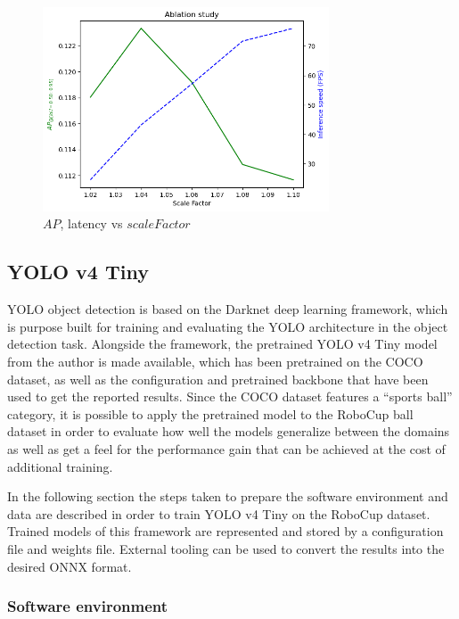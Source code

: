 \documentclass[a4paper,twoside,12pt]{report}
\begin{document}
\begin{figure}[h!]
\begin{center}
\includegraphics[width=8.5cm]{images/vj_ablation.png}
\caption{$AP$, latency vs $scaleFactor$}
\label{fig:vjspeeds}
\end{center}
\end{figure}

\subsection{YOLO v4 Tiny}

YOLO object detection is based on the Darknet deep learning framework, which is purpose built for training and evaluating the YOLO architecture in the object detection task. Alongside the framework, the pretrained YOLO v4 Tiny \citep{yolov4tiny} model from the author is made available, which has been pretrained on the COCO dataset, as well as the configuration and pretrained backbone that have been used to get the reported results. Since the COCO dataset features a ``sports ball'' category, it is possible to apply the pretrained model to the RoboCup ball dataset in order to evaluate how well the models generalize between the domains as well as get a feel for the performance gain that can be achieved at the cost of additional training.

In the following section the steps taken to prepare the software environment and data are described in order to train YOLO v4 Tiny on the RoboCup dataset. Trained models of this framework are represented and stored by a configuration file and weights file. External tooling can be used to convert the results into the desired ONNX format. 

\subsubsection{Software environment}
\end{document}
